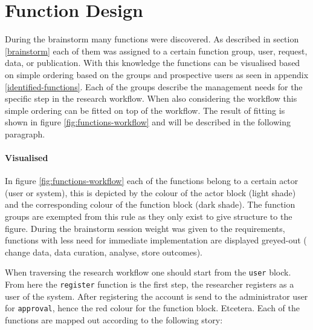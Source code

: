\section{Function Design}

During the brainstorm many functions were discovered.
As described in section \ref{brainstorm} each of them was assigned to a certain function group, \ie{} user, request, data, or publication.
With this knowledge the functions can be visualised based on simple ordering based on the groups and prospective users as seen in appendix \ref{identified-functions}.
Each of the groups describe the management needs for the specific step in the research workflow.
When also considering the workflow this simple ordering can be fitted on top of the workflow.
The result of fitting is shown in figure \ref{fig:functions-workflow} and will be described in the following paragraph.

\paragraph{Visualised}
In figure \ref{fig:functions-workflow} each of the functions belong to a certain actor (user or system), this is depicted by the colour of the actor block (light shade) and the corresponding colour of the function block (dark shade).
The function groups are exempted from this rule as they only exist to give structure to the figure.
During the brainstorm session weight was given to the requirements, functions with less need for immediate implementation are displayed greyed-out (\ie{} change data, data curation, analyse, store outcomes).

When traversing the research workflow one should start from the {\tt user} block.
From here the {\tt register} function is the first step, the researcher registers as a user of the system.
After registering the account is send to the administrator user for {\tt approval}, hence the red colour for the function block.
Etcetera.
Each of the functions are mapped out according to the following story:

